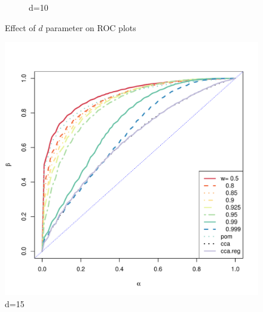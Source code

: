 \documentclass[12pt,oneside,final]{thesis}
\begin{document}
\begin{figure}
\begin{subfigure}[b]{0.47\textwidth}
                \caption{d=10}
                \label{fig:ROC-d-10}
        \end{subfigure}
         
        \caption{Effect of $d$ parameter on ROC plots}\label{fig:ROC-d}
        \label{fig:ROC-d}

\end{figure}

\begin{center}
\begin{figure}

                \centering
               \includegraphics[scale=0.75]{ROC-d-15.pdf}
                \caption{d=15}
                \label{fig:ROC-d-15}
       
\end{figure}
\end{center}
\end{document}
